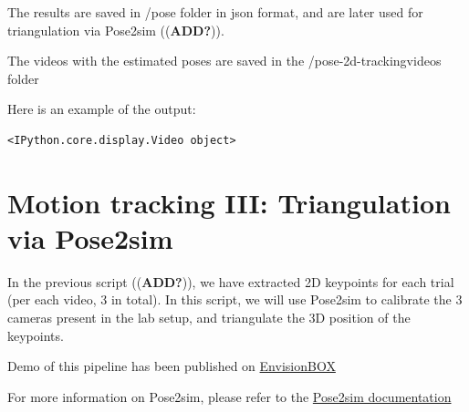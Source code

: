 \documentclass[
  letterpaper,
  DIV=11,
  numbers=noendperiod]{scrreprt}
\begin{document}
The results are saved in /pose folder in json format, and are later used
for triangulation via Pose2sim ((\textbf{ADD?})).

The videos with the estimated poses are saved in the
/pose-2d-trackingvideos folder

Here is an example of the output:

\begin{verbatim}
<IPython.core.display.Video object>
\end{verbatim}


\chapter{Motion tracking III: Triangulation via
Pose2sim}\label{motion-tracking-iii-triangulation-via-pose2sim}

In the previous script ((\textbf{ADD?})), we have extracted 2D keypoints
for each trial (per each video, 3 in total). In this script, we will use
Pose2sim to calibrate the 3 cameras present in the lab setup, and
triangulate the 3D position of the keypoints.

Demo of this pipeline has been published on
\href{https://www.envisionbox.org/embedded_openpose_to_pose2sim_tracking.html}{EnvisionBOX}

For more information on Pose2sim, please refer to the
\href{https://github.com/perfanalytics/pose2sim}{Pose2sim documentation}
\end{document}
